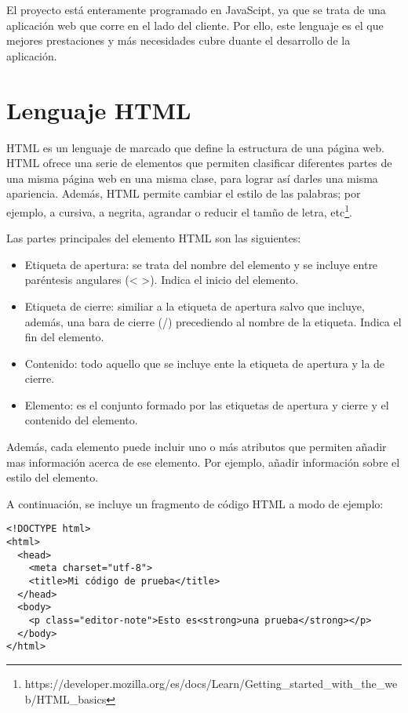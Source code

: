 El proyecto está enteramente programado en JavaScipt, ya que se trata de una aplicación web que corre en el lado del cliente. Por ello, este lenguaje es el que mejores prestaciones y más necesidades cubre duante el desarrollo de la aplicación.

\section{Lenguaje HTML}
HTML es un lenguaje de marcado que define la estructura de una página web. HTML ofrece una serie de elementos que permiten clasificar diferentes partes de una misma página web en una misma clase, para lograr así darles una misma apariencia. Además, HTML permite cambiar el estilo de las palabras; por ejemplo, a cursiva, a negrita, agrandar o reducir el tamño de letra, etc\footnote{https://developer.mozilla.org/es/docs/Learn/Getting_started_with_the_web/HTML_basics}. \newline

Las partes principales del elemento HTML son las siguientes:
\begin{itemize}
    \item Etiqueta de apertura: se trata del nombre del elemento y se incluye entre paréntesis angulares (< >). Indica el inicio del elemento.
    \item Etiqueta de cierre: similiar a la etiqueta de apertura salvo que incluye, además, una bara de cierre (/) precediendo al nombre de la etiqueta. Indica el fin del elemento.
    \item Contenido: todo aquello que se incluye ente la etiqueta de apertura y la de cierre.
    \item Elemento: es el conjunto formado por las etiquetas de apertura y cierre y el contenido del elemento.
\end{itemize}

Además, cada elemento puede incluir uno o más atributos que permiten añadir mas información acerca de ese elemento. Por ejemplo, añadir información sobre el estilo del elemento.\newline

A continuación, se incluye un fragmento de código HTML a modo de ejemplo:
\begin{verbatim}
<!DOCTYPE html>
<html>
  <head>
    <meta charset="utf-8">
    <title>Mi código de prueba</title>
  </head>
  <body>
    <p class="editor-note">Esto es<strong>una prueba</strong></p>
  </body>
</html>
\end{verbatim}

